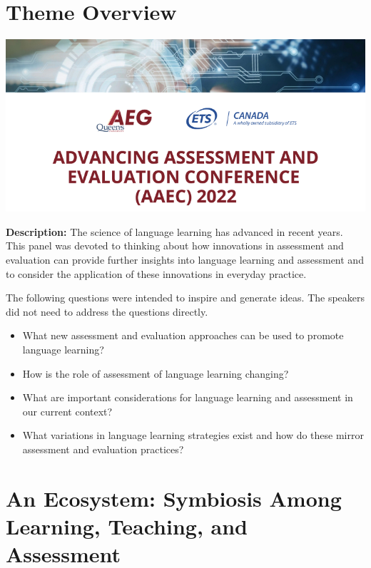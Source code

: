 \documentclass[
]{book}
\begin{document}
\hypertarget{theme-overview-3}{%
\section{Theme Overview}\label{theme-overview-3}}

\includegraphics{Content/H.png}

\textbf{Description:} The science of language learning has advanced in recent years. This panel was devoted to thinking about how innovations in assessment and evaluation can provide further insights into language learning and assessment and to consider the application of these innovations in everyday practice.

The following questions were intended to inspire and generate ideas. The speakers did not need to address the questions directly.

\begin{itemize}
\item
  What new assessment and evaluation approaches can be used to promote language learning?
\item
  How is the role of assessment of language learning changing?
\item
  What are important considerations for language learning and assessment in our current context?
\item
  What variations in language learning strategies exist and how do these mirror assessment
  and evaluation practices?
\end{itemize}

\newpage

\hypertarget{an-ecosystem-symbiosis-among-learning-teaching-and-assessment}{%
\section{An Ecosystem: Symbiosis Among Learning, Teaching, and Assessment}\label{an-ecosystem-symbiosis-among-learning-teaching-and-assessment}}
\end{document}
